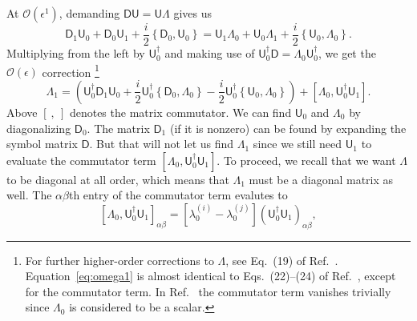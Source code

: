 At $\mathcal{O}(\epsilon^{1})$, demanding $\mathsf{D}\mathsf{U} = \mathsf{U}\Lambda$ gives us
%
\begin{equation}
\mathsf{D}_{1}\mathsf{U}_{0} + \mathsf{D}_{0}\mathsf{U}_{1} + \frac{i}{2}\left\{\mathsf{D}_{0}, \mathsf{U}_{0}\right\} =
  \mathsf{U}_{1}\Lambda_{0} + \mathsf{U}_{0}\Lambda_{1} + \frac{i}{2}\left\{\mathsf{U}_{0}, \Lambda_{0}\right\}.
\end{equation}
%
Multiplying from the left by $\mathsf{U}_{0}^{\dagger}$ and making use of $\mathsf{U}_{0}^{\dagger}\mathsf{D} = \Lambda_{0}\mathsf{U}_{0}^{\dagger}$, we get the $\mathcal{O}(\epsilon)$ correction%
\footnote{For further higher-order corrections to $\Lambda$, see Eq.~(19) of Ref.~\cite{weigert1993}.
Equation~\eqref{eq:omega1} is almost identical to Eqs.~(22)--(24) of Ref.~\cite{venaille2023}, except for the commutator term.
In Ref.~\cite{venaille2023} the commutator term vanishes trivially since $\Lambda_{0}$ is considered to be a scalar.}
%
\begin{equation}
  \Lambda_{1} = \left(\mathsf{U}_{0}^{\dagger}\mathsf{D}_{1}\mathsf{U}_{0} +
  \frac{i}{2}\mathsf{U}_{0}^{\dagger}\left\{\mathsf{D}_{0},\Lambda_{0}\right\} - \frac{i}{2}\mathsf{U}_{0}^{\dagger}\left\{\mathsf{U}_{0},\Lambda_{0}\right\}\right) + \left[\Lambda_{0},\mathsf{U}_{0}^{\dagger}\mathsf{U}_{1}\right].
  \label{eq:omega1}
\end{equation}
%
Above $[~,~]$ denotes the matrix commutator.
We can find $\mathsf{U}_{0}$ and $\Lambda_{0}$ by diagonalizing $\mathsf{D}_{0}$.
The matrix $\mathsf{D}_{1}$ (if it is nonzero) can be found by expanding the symbol matrix $\mathsf{D}$.
But that will not let us find $\Lambda_{1}$ since we still need $\mathsf{U}_{1}$ to evaluate the commutator term $[\Lambda_{0},\mathsf{U}_{0}^{\dagger}\mathsf{U}_{1}]$.
To proceed, we recall that we want $\Lambda$ to be diagonal at all order, which means that $\Lambda_{1}$ must be a diagonal matrix as well.
The $\alpha\beta$th entry of the commutator term evalutes to
%
\begin{equation}
    \left[\Lambda_{0},\mathsf{U}_{0}^{\dagger}\mathsf{U}_{1}\right]_{\alpha\beta} = %
    \left[\lambda_{0}^{(i)} - \lambda_{0}^{(j)}\right]\left(\mathsf{U}_{0}^{\dagger}\mathsf{U}_{1}\right)_{\alpha\beta},
    \label{eq:diagonal}
\end{equation}
